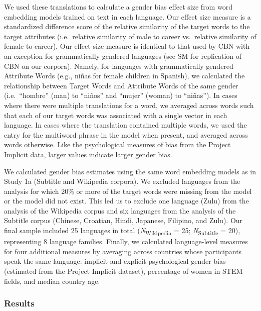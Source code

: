 \documentclass[9pt,twocolumn,twoside,lineno]{pnas-new}
\begin{document}
We used these translations to calculate a gender bias effect size from
word embedding models trained on text in each language. Our effect size
measure is a standardized difference score of the relative similarity of
the target words to the target attributes (i.e.~relative similarity of
male to career vs.~relative similarity of female to career). Our effect
size measure is identical to that used by CBN with an exception for
grammatically gendered languages (see SM for replication of CBN on our
corpora). Namely, for languages with grammatically gendered Attribute
Words (e.g., niñas for female children in Spanish), we calculated the
relationship between Target Words and Attribute Words of the same gender
(i.e.~\enquote{hombre} (man) to \enquote{niños} and \enquote{mujer}
(woman) to \enquote{niñas}). In cases where there were multiple
translations for a word, we averaged across words such that each of our
target words was associated with a single vector in each language. In
cases where the translation contained multiple words, we used the entry
for the multiword phrase in the model when present, and averaged across
words otherwise. Like the psychological measures of bias from the
Project Implicit data, larger values indicate larger gender bias.

We calculated gender bias estimates using the same word embedding models
as in Study 1a (Subtitle and Wikipedia corpora). We excluded languages
from the analysis for which 20\% or more of the target words were
missing from the model or the model did not exist. This led us to
exclude one language (Zulu) from the analysis of the Wikipedia corpus
and six languages from the analysis of the Subtitle corpus (Chinese,
Croatian, Hindi, Japanese, Filipino, and Zulu). Our final sample
included 25 languages in total (\emph{N}\textsubscript{Wikipedia} = 25;
\emph{N}\textsubscript{Subtitle} = 20), representing 8 language
families. Finally, we calculated language-level measures for four
additional measures by averaging across countries whose participants
speak the same language: implicit and explicit psychological gender bias
(estimated from the Project Implicit dataset), percentage of women in
STEM fields, and median country age.

\subsubsection*{Results}\label{results-2}
\end{document}
